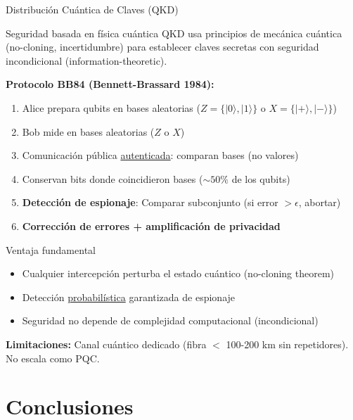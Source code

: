 \documentclass[aspectratio=169]{beamer}
\begin{document}
\begin{frame}{Distribución Cuántica de Claves (QKD)}
\footnotesize
\begin{block}{Seguridad basada en física cuántica}
QKD usa principios de mecánica cuántica (no-cloning, incertidumbre) para establecer claves secretas con seguridad incondicional (information-theoretic).
\end{block}

\textbf{Protocolo BB84 (Bennett-Brassard 1984):}
\begin{enumerate}
\item Alice prepara qubits en bases aleatorias ($Z = \{|0\rangle, |1\rangle\}$ o $X = \{|+\rangle, |-\rangle\}$)
\item Bob mide en bases aleatorias ($Z$ o $X$)
\item Comunicación pública \underline{autenticada}: comparan bases (no valores)
\item Conservan bits donde coincidieron bases ($\sim 50\%$ de los qubits)
\item \textbf{Detección de espionaje}: Comparar subconjunto (si error $> \epsilon$, abortar)
\item \textbf{Corrección de errores + amplificación de privacidad}
\end{enumerate}

\begin{exampleblock}{Ventaja fundamental}
\begin{itemize}
\item Cualquier intercepción perturba el estado cuántico (no-cloning theorem)
\item Detección \underline{probabilística} garantizada de espionaje
\item Seguridad no depende de complejidad computacional (incondicional)
\end{itemize}
\end{exampleblock}

\textbf{Limitaciones:} Canal cuántico dedicado (fibra $<$ 100-200 km sin repetidores). No escala como PQC.
\end{frame}

\section{Conclusiones}
\end{document}
